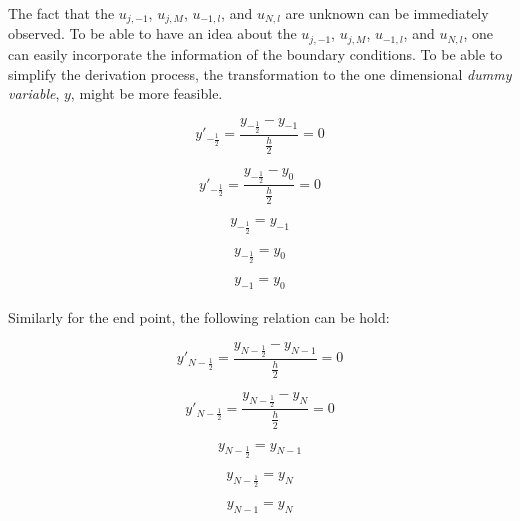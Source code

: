 \documentclass[letterpaper,12pt]{article}
\begin{document}
The fact that the $ u_{j,- 1}$, $u_{j,M}$, $u_{-1,l}$, and $u_{N,l}$  are unknown can be immediately observed. To be able to have an idea about the $ u_{j,- 1}$, $u_{j,M}$, $u_{-1,l}$, and $u_{N,l}$, one can easily incorporate the information of the boundary conditions. To be able to simplify the derivation process, the transformation to the one dimensional \textit{dummy variable}, $y$, might be more feasible.

\begin{equation*}
    y'_{-\frac{1}{2}} = \frac{y_{-\frac{1}{2}} - y_{-1}}{\frac{h}{2}} = 0
\end{equation*}

\begin{equation*}
    y'_{-\frac{1}{2}} = \frac{y_{-\frac{1}{2}} - y_{0}}{\frac{h}{2}} = 0
\end{equation*}

\begin{equation*}
    y_{-\frac{1}{2}} = y_{-1}
\end{equation*}

\begin{equation*}
    y_{-\frac{1}{2}} = y_{0}
\end{equation*}

\begin{equation*}
    \boxed{y_{-1} = y_{0}}
\end{equation*}

\paragraph{} Similarly for the end point, the following relation can be hold:

\begin{equation*}
    y'_{N-\frac{1}{2}} = \frac{y_{N-\frac{1}{2}} - y_{N-1}}{\frac{h}{2}} = 0
\end{equation*}

\begin{equation*}
    y'_{N-\frac{1}{2}} = \frac{y_{N-\frac{1}{2}} - y_{N}}{\frac{h}{2}} = 0
\end{equation*}

\begin{equation*}
    y_{N-\frac{1}{2}} = y_{N-1}
\end{equation*}

\begin{equation*}
    y_{N-\frac{1}{2}} = y_{N}
\end{equation*}

\begin{equation*}
    \boxed{y_{N-1} = y_{N}}
\end{equation*}
\end{document}

